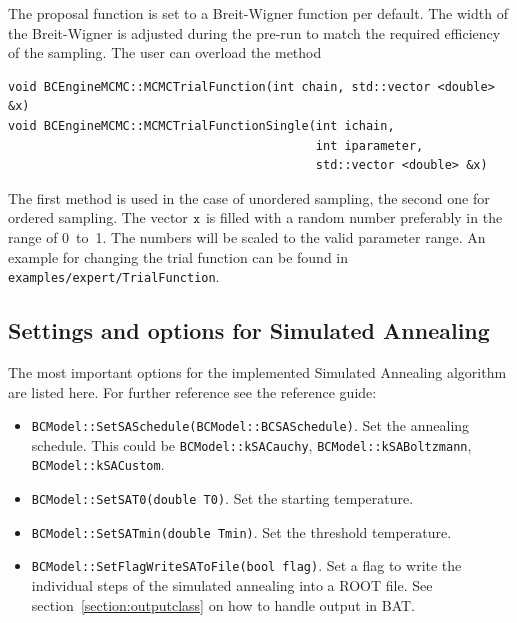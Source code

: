 \documentclass[11pt, a4paper]{article}
\begin{document}
The proposal function is set to a Breit-Wigner function per
default. The width of the Breit-Wigner is adjusted during the pre-run
to match the required efficiency of the sampling. The user can
overload the method
%
\begin{verbatim}
void BCEngineMCMC::MCMCTrialFunction(int chain, std::vector <double> &x)
void BCEngineMCMC::MCMCTrialFunctionSingle(int ichain,
                                           int iparameter,
                                           std::vector <double> &x)
\end{verbatim}

The first method is used in the case of unordered sampling, the second
one for ordered sampling. The vector $\verb|x|$ is filled with a
random number preferably in the range of 0~to~1. The numbers will be
scaled to the valid parameter range. An example for changing the trial
function can be found in \verb|examples/expert/TrialFunction|.\\


\subsection{Settings and options for Simulated Annealing}
\label{section:settings:SA}

The most important options for the implemented Simulated Annealing
algorithm are listed here. For further reference see the reference
guide:
%
\begin{itemize}
\item \verb|BCModel::SetSASchedule(BCModel::BCSASchedule)|. Set the
  annealing schedule. This could be \verb|BCModel::kSACauchy|,
  \verb|BCModel::kSABoltzmann|, \verb|BCModel::kSACustom|.
\item \verb|BCModel::SetSAT0(double T0)|. Set the starting
  temperature.
\item \verb|BCModel::SetSATmin(double Tmin)|. Set the threshold
  temperature.
\item \verb|BCModel::SetFlagWriteSAToFile(bool flag)|. Set a flag to
 write the individual steps of the simulated annealing into a ROOT
 file. See section~\ref{section:outputclass} on how to handle output in
 BAT.
\end{itemize}

\end{document}
